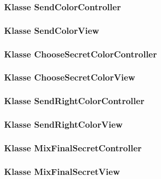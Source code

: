 \documentclass{article}
\begin{document}
	\subsubsection{Klasse SendColorController}

	\subsubsection{Klasse SendColorView}

	\subsubsection{Klasse ChooseSecretColorController}

	\subsubsection{Klasse ChooseSecretColorView}

	\subsubsection{Klasse SendRightColorController}

	\subsubsection{Klasse SendRightColorView}

	\subsubsection{Klasse MixFinalSecretController}

	\subsubsection{Klasse MixFinalSecretView}
	
 \restoregeometry

\glsaddall
\printglossary[numberedsection, style=altlist]
\end{document}
